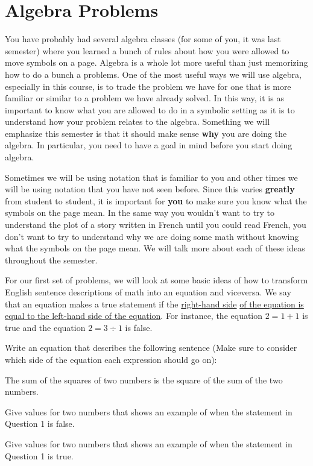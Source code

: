 \section{Algebra Problems}
You have probably had several algebra classes (for some of you, it was last semester) where you learned a bunch of rules about how you were allowed to move symbols on a page. Algebra is a whole lot more useful than just memorizing how to do a bunch a problems. One of the most useful ways we will use algebra, especially in this course, is to trade the problem we have for one that is more familiar or similar to a problem we have already solved. In this way, it is as important to know what you are allowed to do in a symbolic setting as it is to understand how your problem relates to the algebra. Something we will emphasize this semester is that it should make sense \textbf{why} you are doing the algebra. In particular, you need to have a goal in mind before you start doing algebra.

Sometimes we will be using notation that is familiar to you and other times we will be using notation that you have not seen before. Since this varies \textbf{greatly} from student to student, it is important for \textbf{you} to make sure you know what the symbols on the page mean. In the same way you wouldn't want to try to understand the plot of a story written in French until you could read French, you don't want to try to understand why we are doing some math without knowing what the symbols on the page mean. We will talk more about each of these ideas throughout the semester.


For our first set of problems, we will look at some basic ideas of how to transform English sentence descriptions of math into an equation and viceversa. We say that an equation makes a true statement if the \underline{right-hand side} \underline{of the equation is equal to the left-hand side of the equation}. For instance, the equation $2=1+1$ is true and the equation $2=3 \div 1$ is false.

\bq Write an equation that describes the following sentence (Make sure to consider which side of the equation each expression should go on):

The sum of the squares of two numbers is the square of the sum of the two numbers.

\eq

\bq \be
\item Give values for two numbers that shows an example of when the statement in Question 1 is false.
\item Give values for two numbers that shows an example of when the statement in Question 1 is true.
\ee \eq

